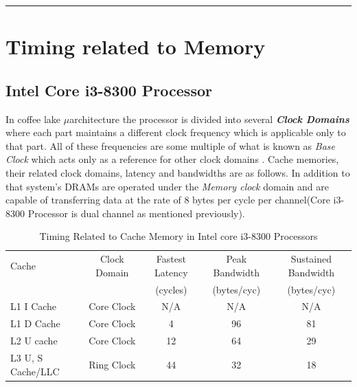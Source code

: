 \documentclass[a4paper,11pt]{article}
\begin{document}
\vspace{1cm}\hrule
\section{Timing related to Memory}

\subsection{Intel Core i3-8300 Processor}
In coffee lake $\mu$architecture the processor is divided into several \textbf{\textit{Clock Domains}} where each part maintains a different clock frequency which is applicable only to that part. All of these frequencies are some multiple of what is known as \textit{Base Clock} which acts only as a reference for other clock domains\cite{Skylake} . Cache memories, their related clock domains, latency and bandwidths are as follows. In addition to that system's DRAMs are operated under the \textit{Memory clock} domain and are capable of transferring data at the rate of 8 bytes per cycle per channel\cite{Coffee}(Core i3-8300 Processor is dual channel as mentioned previously).

 \begin{table}[!h]
	\centering
	\begin{tabular}{l| c|c|c|c }
		Cache &Clock Domain&Fastest Latency&Peak Bandwidth&Sustained Bandwidth\\
		&&(cycles)&(bytes/cyc)&(bytes/cyc)\\\hline
		L1 I Cache&Core Clock &N/A&N/A&N/A\\
		L1 D Cache&Core Clock &4&96&81\\
		L2 U cache&Core Clock &12&64&29\\
		L3 U, S Cache/LLC&Ring Clock&44&32&18\\
		\hline\hline
	\end{tabular}
	\caption{Timing Related to Cache Memory in Intel core i3-8300 Processors\cite{iaorm}}
\end{table}
\end{document}
